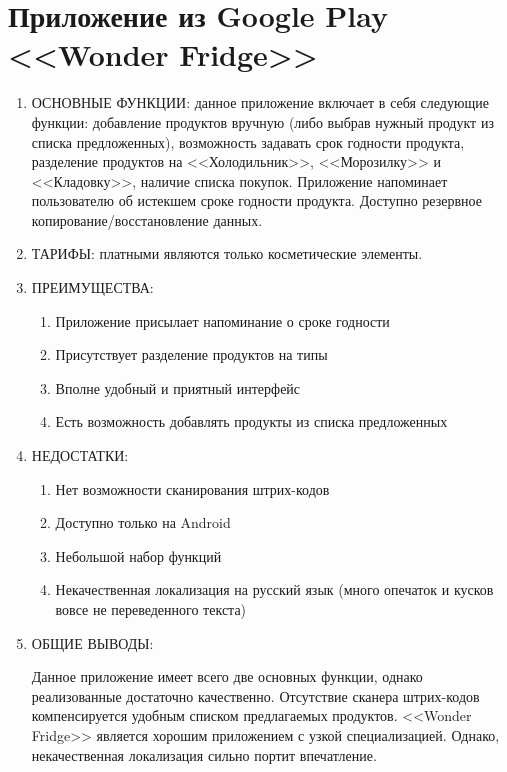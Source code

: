 \documentclass[14pt]{extreport}
\begin{document}
\section{Приложение из Google Play <<Wonder Fridge>>\cite{bib2}}
\begin{enumerate}
\item ОСНОВНЫЕ ФУНКЦИИ: данное приложение включает в себя следующие функции: добавление продуктов вручную (либо выбрав нужный продукт из списка предложенных), возможность задавать срок годности продукта, разделение продуктов на <<Холодильник>>, <<Морозилку>> и <<Кладовку>>, наличие списка покупок. Приложение напоминает пользователю об истекшем сроке годности продукта. Доступно резервное копирование/восстановление данных.

\item ТАРИФЫ: платными являются только косметические элементы.
\item ПРЕИМУЩЕСТВА: 
\begin{enumerate}
    \item Приложение присылает напоминание о сроке годности
    \item Присутствует разделение продуктов на типы
    \item Вполне удобный и приятный интерфейс
    \item Есть возможность добавлять продукты из списка предложенных
\end{enumerate}

\item НЕДОСТАТКИ: 
\begin{enumerate}
    \item Нет возможности сканирования штрих-кодов
    \item Доступно только на Android
    \item Небольшой набор функций
    \item Некачественная локализация на русский язык (много опечаток и кусков вовсе не переведенного текста)
\end{enumerate}
\item ОБЩИЕ ВЫВОДЫ: 

Данное приложение имеет всего две основных функции, однако реализованные достаточно качественно. Отсутствие сканера штрих-кодов компенсируется удобным списком предлагаемых продуктов. <<Wonder Fridge>> является хорошим приложением с узкой специализацией. Однако, некачественная локализация сильно портит впечатление.
\end{enumerate}
\end{document}
